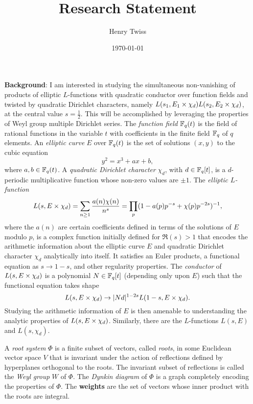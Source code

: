 \documentclass[12pt,reqno,oneside]{amsart}
\title{Research Statement}
\author{Henry Twiss}
\date{\today}
\begin{document}
\maketitle

\textbf{Background}: I am interested in studying the simultaneous non-vanishing of products of elliptic $L$-functions with quadratic conductor over function fields and twisted by quadratic Dirichlet characters, namely $L(s_{1},E_{1} \times \chi_{d})L(s_{2},E_{2} \times \chi_{d})$, at the central value $s = \frac{1}{2}$. This will be accomplished by leveraging the properties of Weyl group multiple Dirichlet series. The \textit{function field} $\mathbb{F}_{q}(t)$ is the field of rational functions in the variable $t$ with coefficients in the finite field $\mathbb{F}_{q}$ of $q$ elements. An \textit{elliptic curve} $E$ over $\mathbb{F}_{q}(t)$ is the set of solutions $(x,y)$ to the cubic equation
\[
  y^{2} = x^{3}+ax+b,
\]
where $a,b \in \mathbb{F}_{q}(t)$. A \textit{quadratic Dirichlet character} $\chi_{d}$, with $d \in \mathbb{F}_{q}[t]$, is a $d$-periodic multiplicative function whose non-zero values are $\pm1$. The \textit{elliptic $L$-function}
\[
  L(s,E \times \chi_{d}) = \sum_{n \ge 1}\frac{a(n)\chi(n)}{n^{s}} = \prod_{p}(1-a(p)p^{-s}+\chi(p)p^{-2s})^{-1},
\]
where the $a(n)$ are certain coefficients defined in terms of the solutions of $E$ modulo $p$, is a complex function initially defined for $\Re(s) > 1$ that encodes the arithmetic information about the elliptic curve $E$ and quadratic Dirichlet character $\chi_{d}$ analytically into itself. It satisfies an Euler products, a functional equation as $s \to 1-s$, and other regularity properties. The \textit{conductor} of $L(s,E \times \chi_{d})$ is a polynomial $N \in \mathbb{F}_{q}[t]$ (depending only upon $E$) such that the functional equation takes shape
\[
  L(s,E \times \chi_{d}) \to |Nd|^{1-2s}L(1-s,E \times \chi_{d}).
\]
Studying the arithmetic information of $E$ is then amenable to understanding the analytic properties of $L(s,E \times \chi_{d})$. Similarly, there are the $L$-functions $L(s,E)$ and $L(s,\chi_{d})$.

A \textit{root system} $\Phi$ is a finite subset of vectors, called \textit{roots}, in some Euclidean vector space $V$ that is invariant under the action of reflections defined by hyperplanes orthogonal to the roots. The invariant subset of reflections is called the \textit{Weyl group} $W$ of $\Phi$. The \textit{Dynkin diagram} of $\Phi$ is a graph completely encoding the properties of $\Phi$. The \textbf{weights} are the set of vectors whose inner product with the roots are integral.
\end{document}
